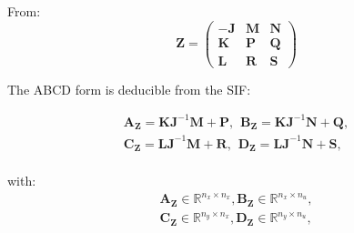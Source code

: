 \addtocounter{framenumber}{-1}
\begin{frame}
	From:
	\begin{equation} \label{zmatrix}
		\boldsymbol{Z}=
		\begin{pmatrix}
			\boldsymbol{-J} & \boldsymbol{M} & \boldsymbol{N} \\
			\boldsymbol{K} & \boldsymbol{P} & \boldsymbol{Q} \\
			\boldsymbol{L} & \boldsymbol{R} & \boldsymbol{S} 
		\end{pmatrix}
	\end{equation}

	The ABCD form is deducible from the SIF:

	\begin{eqnarray} \label{abcdtranspose}
		\boldsymbol{A_Z} = \boldsymbol{KJ}^{-1}\boldsymbol{M} +\boldsymbol{P}, \hspace{5pt}
		\boldsymbol{B_Z} = \boldsymbol{KJ}^{-1}\boldsymbol{N} +\boldsymbol{Q}, \nonumber \\
		\boldsymbol{C_Z} = \boldsymbol{LJ}^{-1}\boldsymbol{M} +\boldsymbol{R}, \hspace{5pt}
		\boldsymbol{D_Z} = \boldsymbol{LJ}^{-1}\boldsymbol{N} +\boldsymbol{S}, \nonumber \\
	\end{eqnarray}

	with:
	\begin{eqnarray}
		\boldsymbol{A_Z} \in \mathbb{R}^{n_x \times n_x},
		\boldsymbol{B_Z} \in \mathbb{R}^{n_x \times n_u}, \nonumber \\
		\boldsymbol{C_Z} \in \mathbb{R}^{n_y \times n_x},
		\boldsymbol{D_Z} \in \mathbb{R}^{n_y \times n_u},
	\end{eqnarray}
\end{frame}

